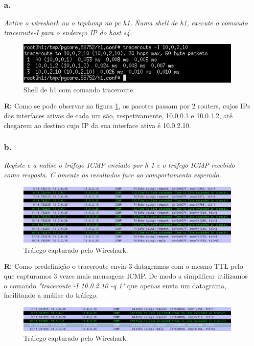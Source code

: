 \documentclass{llncs}
\begin{document}
\subsubsection{a.}
\emph{Active o wireshark ou o tcpdump no pc h1. Numa shell de h1, execute o comando traceroute-I para o endereço IP do host s4. }

\begin{figure}[H]
\begin{center}
\includegraphics[scale=0.54]{traceroute_a.png} 
\end{center}
\caption{\label{fig:shellh1}Shell de h1 com comando traceroute.}
\end{figure} 
\par
\textbf{R:} Como se pode observar na figura \ref{fig:shellh1}, os pacotes passam por 2 routers, cujos IPs das interfaces ativas de cada um são, respetivamente, 10.0.0.1 e 10.0.1.2, até chegarem ao destino cujo IP da sua interface ativa é 10.0.2.10.

\subsubsection{b.}
\emph{Registe  e  a
nalise  o  tráfego
ICMP 
enviado
por  h
1
e 
o  tráfego  ICMP 
recebido
como
resposta. C
omente
os resultados
face 
ao comportamento 
esperado.}

\begin{figure}[H]
\begin{center}
\includegraphics[scale=0.40]{trafego_b.png} 
\end{center}
\caption{\label{fig:trafego_b}Tráfego capturado pelo Wireshark.}
\end{figure} 
\textbf{R:} Como predefinição o traceroute envia 3 datagramas com o mesmo TTL pelo que capturamos 3 vezes mais mensagens ICMP. 
De modo a simplificar utilizamos o comando \emph{"traceroute -I 10.0.2.10 -q 1"} que apenas envia um datagrama, facilitando a análise do tráfego.
\begin{figure}[H]
\begin{center}
\includegraphics[scale=0.40]{trafego_b2.png} 
\end{center}
\caption{\label{fig:trafego_b2}Tráfego capturado pelo Wireshark.}
\end{figure}
\end{document}
